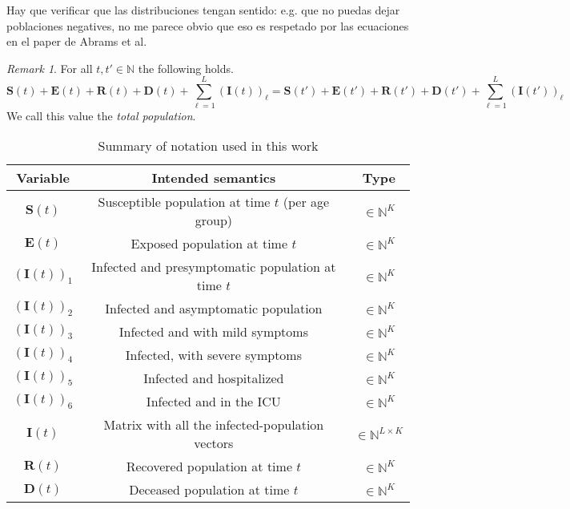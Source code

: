 \documentclass[a4paper]{article}
\renewcommand{\vec}[1]{\boldsymbol{#1}}
\theoremstyle{remark}
\newtheorem{remark}{Remark}
\begin{document}
{\color{red} Hay que verificar que las distribuciones tengan sentido: e.g. que no puedas dejar poblaciones negatives, no me parece obvio que eso es respetado por las ecuaciones en el paper de Abrams et al.}







\begin{remark}
    For all $t,t' \in \mathbb{N}$ the following holds.
    \[
        \vec{S}(t) + \vec{E}(t) + \vec{R}(t) + \vec{D}(t) + \sum_{\ell = 1}^L (\vec{I}(t))_\ell = \vec{S}(t') + \vec{E}(t') + \vec{R}(t') + \vec{D}(t') + \sum_{\ell = 1}^L (\vec{I}(t'))_\ell
    \]
    We call this value the \emph{total population}.
\end{remark}

\begin{table}[t]
    \centering
    \begin{tabular}{c | c | c}
        Variable & Intended semantics & Type\\
        \hline
        $\vec{S}(t)$ & Susceptible population at time $t$ (per age group) & ${} \in \mathbb{N}^K$\\
        $\vec{E}(t)$ & Exposed population at time $t$ & ${} \in \mathbb{N}^K$\\
        $(\vec{I}(t))_1$ & Infected and presymptomatic population at time $t$ & ${} \in \mathbb{N}^K$\\
        $(\vec{I}(t))_2$ & Infected and asymptomatic population & ${} \in \mathbb{N}^K$\\
        $(\vec{I}(t))_3$ & Infected and with mild symptoms & ${} \in \mathbb{N}^K$\\
        $(\vec{I}(t))_4$ & Infected, with severe symptoms & ${} \in \mathbb{N}^K$\\
        $(\vec{I}(t))_5$ & Infected and hospitalized & ${} \in \mathbb{N}^K$\\
        $(\vec{I}(t))_6$ & Infected and in the ICU & ${} \in \mathbb{N}^K$\\
        $\vec{I}(t)$ & Matrix with all the infected-population vectors & ${} \in \mathbb{N}^{L \times K}$\\
        $\vec{R}(t)$ & Recovered population at time $t$ & ${} \in \mathbb{N}^K$\\
        $\vec{D}(t)$ & Deceased population at time $t$ & ${} \in \mathbb{N}^K$
    \end{tabular}
    \caption{Summary of notation used in this work}
    \label{tab:my_label}
\end{table}
\end{document}
